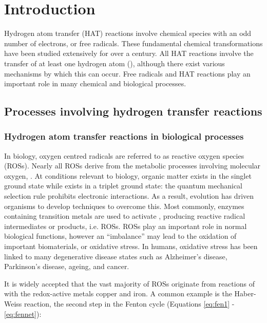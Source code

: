 
\chapter{Introduction}

Hydrogen atom transfer (HAT) reactions involve chemical species with an odd
number of electrons, or free radicals. These fundamental chemical
transformations have been studied extensively for over a
century.\cite{Kochi1973,Parsons2000} All HAT reactions involve the transfer of
at least one hydrogen atom (), although there exist various mechanisms
by which this can occur. Free radicals and HAT reactions play an important role
in many chemical and biological processes.\cite{Halliwell2015}

\section{Processes involving hydrogen transfer reactions}

\subsection{Hydrogen atom transfer reactions in biological processes}

In biology, oxygen centred radicals are referred to as reactive oxygen species
(ROSs). Nearly all ROSs derive from the metabolic processes involving molecular
oxygen, .\cite{Barnham2004} At conditions relevant to biology, organic
matter exists in the singlet ground state while  exists in a triplet
ground state: the quantum mechanical selection rule prohibits electronic
interactions. As a result, evolution has driven organisms to develop techniques
to overcome this. Most commonly, enzymes containing transition metals are used
to activate , producing reactive radical intermediates or products,
i.e. ROSs. ROSs play an important role in normal biological functions, however
an ``imbalance'' may lead to the oxidation of important biomaterials, or
oxidative stress.\cite{Halliwell2015} In humans, oxidative stress has been
linked to many degenerative disease states such as Alzheimer's
disease,\cite{Barnham2004,Valko2007} Parkinson's disease,\cite{Hwang2013}
ageing, and cancer.\cite{Halliwell2007}

It is widely accepted that the vast majority of ROSs originate from reactions of
 with the redox-active metals copper and iron.\cite{Halliwell2015} A
common example is the Haber-Weiss reaction, the second step in the Fenton cycle
(Equations \ref{eq:fen1} - \ref{eq:fennet}):

